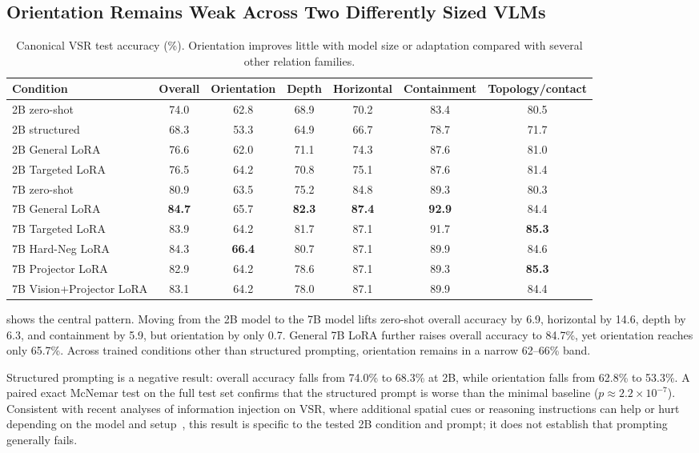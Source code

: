 \subsection{Orientation Remains Weak Across Two Differently Sized VLMs}
\begin{table}[t]
\centering
\small
\caption{Canonical VSR test accuracy (\%). Orientation improves little with model size or adaptation compared with several other relation families.}
\label{tab:vsr-main}
\begin{tabular}{lcccccc}
\toprule
Condition & Overall & Orientation & Depth & Horizontal & Containment & Topology/contact \\
\midrule
2B zero-shot & 74.0 & 62.8 & 68.9 & 70.2 & 83.4 & 80.5 \\
2B structured & 68.3 & 53.3 & 64.9 & 66.7 & 78.7 & 71.7 \\
2B General LoRA & 76.6 & 62.0 & 71.1 & 74.3 & 87.6 & 81.0 \\
2B Targeted LoRA & 76.5 & 64.2 & 70.8 & 75.1 & 87.6 & 81.4 \\
7B zero-shot & 80.9 & 63.5 & 75.2 & 84.8 & 89.3 & 80.3 \\
7B General LoRA & \textbf{84.7} & 65.7 & \textbf{82.3} & \textbf{87.4} & \textbf{92.9} & 84.4 \\
7B Targeted LoRA & 83.9 & 64.2 & 81.7 & 87.1 & 91.7 & \textbf{85.3} \\
7B Hard-Neg LoRA & 84.3 & \textbf{66.4} & 80.7 & 87.1 & 89.9 & 84.6 \\
7B Projector LoRA & 82.9 & 64.2 & 78.6 & 87.1 & 89.3 & \textbf{85.3} \\
7B Vision+Projector LoRA & 83.1 & 64.2 & 78.0 & 87.1 & 89.9 & 84.4 \\
\bottomrule
\end{tabular}
\end{table}

 shows the central pattern. Moving from the 2B model to the 7B model lifts zero-shot overall accuracy by 6.9\pp, horizontal by 14.6\pp, depth by 6.3\pp, and containment by 5.9\pp, but orientation by only 0.7\pp. General 7B LoRA further raises overall accuracy to 84.7\%, yet orientation reaches only 65.7\%. Across trained conditions other than structured prompting, orientation remains in a narrow 62--66\% band.

Structured prompting is a negative result: overall accuracy falls from 74.0\% to 68.3\% at 2B, while orientation falls from 62.8\% to 53.3\%. A paired exact McNemar test on the full test set confirms that the structured prompt is worse than the minimal baseline ($p\approx2.2\times10^{-7}$). Consistent with recent analyses of information injection on VSR, where additional spatial cues or reasoning instructions can help or hurt depending on the model and setup~\cite{akasaka2026whenmore}, this result is specific to the tested 2B condition and prompt; it does not establish that prompting generally fails.

